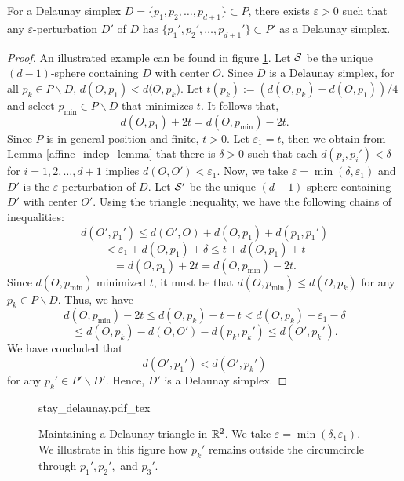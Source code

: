 \documentclass[letterpaper,titlepage]{article}
\newcommand{\incfig}[1]{%
    {#1.pdf_tex}
}
\begin{document}
\begin{lem}\label{stay-delaunay}
        For a Delaunay simplex $D= \{p_1,p_2,\dots,p_{d+1}\} \subset P$, there exists $\varepsilon>0$ such that any $\varepsilon$-perturbation $D'$ of $D$ has $\{p_1',p_2',\dots,p_{d+1}'\} \subset P'$ as a Delaunay simplex.
    \end{lem}
    \begin{proof}
        An illustrated example can be found in figure \ref{fig:stay_delaunay}. Let $\mathcal{S}$ be the unique $(d-1)$-sphere containing $D$ with center $O$. Since $D$ is a Delaunay simplex, for all $p_k \in P\backslash D$, $d(O,p_1) < d(O,p_k$). Let $t(p_k):=(d(O,p_k)-d(O,p_1))/4$ and select $p_{\min} \in P\backslash{D}$ that minimizes $t$. It follows that,
        $$d(O,p_1)+2t=d(O,p_{\min})-2t.$$
        Since $P$ is in general position and finite, $t>0$. Let $\varepsilon_1 = t$, then we obtain from Lemma \ref{affine_indep_lemma} that there is $\delta>0$ such that each $d(p_i,p_i')<\delta$ for $i=1,2,\dots,d+1$ implies $d(O,O')<\varepsilon_1$. Now, we take $\varepsilon = \min(\delta, \varepsilon_1)$ and $D'$ is the $\varepsilon$-perturbation of $D$. Let $\mathcal{S}'$ be the unique $(d-1)$-sphere containing $D'$ with center $O'$. Using the triangle inequality, we have the following chains of inequalities:
        $$d(O',p_1') \leq d(O',O)+d(O,p_1)+d(p_1,p_1')$$
        $$< \varepsilon_1 + d(O,p_1)+\delta \leq t+d(O,p_1)+t$$
        $$= d(O,p_1)+2t = d(O,p_{\min})-2t.$$
        Since $d(O,p_{\min})$ minimized $t$, it must be that $d(O,p_{\min}) \leq d(O,p_k)$ for any $p_k \in P\backslash D$. Thus, we have
        $$d(O,p_{\min})-2t \leq d(O,p_k)-t-t < d(O,p_{k})-\varepsilon_1-\delta$$
        $$\leq d(O,p_{k})-d(O,O')-d(p_{k},p_{k}') \leq d(O',p_{k}').$$
        We have concluded that
        $$d(O',p_1')<d(O',p_{k}')$$
        for any $p_k' \in P'\backslash D'$. Hence, $D'$ is a Delaunay simplex.
    \end{proof}
    \begin{figure}[ht!]
        \centering
        \fontsize{8pt}{9.8pt}\selectfont
        \def\svgwidth{\textwidth}
        \incfig{stay_delaunay}
        \caption{Maintaining a Delaunay triangle in $\mathbb{R}^2$. We take $\varepsilon = \min(\delta,\varepsilon_1)$. We illustrate in this figure how $p_k'$ remains outside the circumcircle through $p_1', p_2',$ and $p_3'$.}
        \label{fig:stay_delaunay}
    \end{figure}
\end{document}
